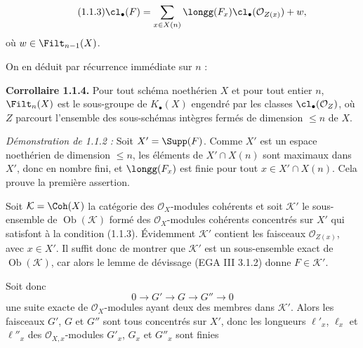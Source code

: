 \begin{equation}\tag{1.1.3}
\cl_\bullet(F)=\sum_{x\in X(n)}\longg(F_x)\cl_\bullet(\mathcal O_{Z(x)})+w,
\end{equation}
où $w\in\Filt_{n-1}(X)$.

On en déduit par récurrence immédiate sur $n$ :

\textbf{Corrollaire 1.1.4.} Pour tout schéma noethérien $X$ et pour tout entier $n$, $\Filt_n(X)$ est le sous-groupe de $K_\bullet(X)$ engendré par les classes $\cl_\bullet(\mathcal O_Z)$, où $Z$ parcourt l'ensemble des sous-schémas intègres fermés de dimension $\leq n$ de $X$.

\emph{Démonstration de 1.1.2 :} Soit $X'=\Supp(F)$. Comme $X'$ est un espace noethérien de dimension $\leq n$, les éléments de $X'\cap X(n)$ sont maximaux dans $X'$, donc en nombre fini, et $\longg(F_x)$ est finie pour tout $x\in X'\cap X(n)$. Cela prouve la première assertion.

Soit $\mathcal K=\Coh(X)$ la catégorie des $\mathcal O_X$-modules cohérents et soit $\mathcal K'$ le sous-ensemble de $\operatorname{Ob}(\mathcal K)$ formé des $\mathcal O_X$-modules cohérents concentrés sur $X'$ qui satisfont à la condition (1.1.3). Évidemment $\mathcal K'$ contient les faisceaux $\mathcal O_{Z(x)}$, avec $x\in X'$. Il suffit donc de montrer que $\mathcal K'$ est un sous-ensemble exact de $\operatorname{Ob}(\mathcal K)$, car alors le lemme de dévissage (EGA III 3.1.2) donne $F\in\mathcal K'$.

Soit donc
\begin{equation}\tag{1.1.5}
0\longrightarrow G'\longrightarrow G\longrightarrow G''\longrightarrow0
\end{equation}
une suite exacte de $\mathcal O_X$-modules ayant deux des membres dans $\mathcal K'$. Alors les faisceaux $G'$, $G$ et $G''$ sont tous concentrés sur $X'$, donc les longueurs $\ell'_x$, $\ell_x$ et $\ell''_x$ des $\mathcal O_{X,x}$-modules $G'_x$, $G_x$ et $G''_x$ sont finies
